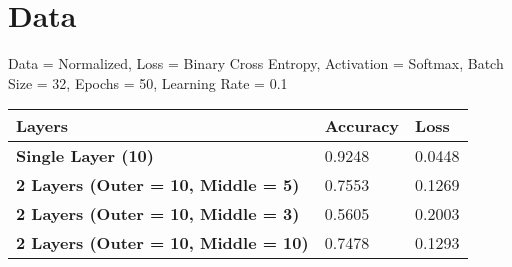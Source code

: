 \documentclass{article}
\begin{document}






\section{Data}

Data = Normalized, Loss = Binary Cross Entropy, Activation = Softmax, Batch Size = 32, Epochs = 50, Learning Rate = 0.1
\begin{table}[h!]
  \begin{center}
    \label{tab:table1}
    \begin{tabular}{l|l|l} 
      \textbf{Layers} & \textbf{Accuracy} & \textbf{Loss}\\
      \hline
      \textbf{Single Layer (10)} & 0.9248 & 0.0448\\
      \textbf{2 Layers (Outer = 10, Middle = 5)} & 0.7553 & 0.1269\\
      \textbf{2 Layers (Outer = 10, Middle = 3)} & 0.5605 & 0.2003\\
      \textbf{2 Layers (Outer = 10, Middle = 10)} & 0.7478 & 0.1293\\
    \end{tabular}
  \end{center}
\end{table}
\end{document}
